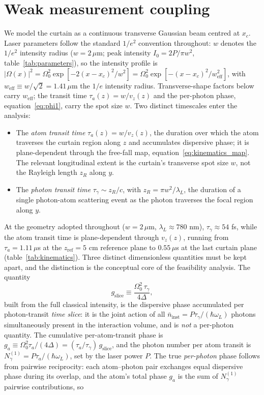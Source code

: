 \documentclass[11pt,a4paper]{article}
\begin{document}
\section{Weak measurement coupling}
\label{sec:coupling}

We model the curtain as a continuous transverse Gaussian beam centred at $x_c$. Laser parameters follow the standard $1/e^2$ convention throughout: $w$ denotes the $1/e^2$ intensity radius ($w = 2\,\mu$m; peak intensity $I_0 = 2P/\pi w^2$, table~\ref{tab:parameters}), so the intensity profile is $|\Omega(x)|^2 = \Omega_0^2 \exp[-2(x-x_c)^2/w^2] = \Omega_0^2 \exp[-(x-x_c)^2/w_\text{eff}^2]$, with $w_\text{eff} \equiv w/\sqrt{2} = 1.41\,\mu$m the $1/e$ intensity radius. Transverse-shape factors below carry $w_\text{eff}$; the transit time $\tau_a(z) = w/v_z(z)$ and the per-photon phase, equation~\eqref{eq:phi1}, carry the spot size $w$. Two distinct timescales enter the analysis:
\begin{itemize}
\item The \emph{atom transit time} $\tau_a(z) = w/v_z(z)$, the duration over which the atom traverses the curtain region along $z$ and accumulates dispersive phase; it is plane-dependent through the free-fall map, equation~\eqref{eq:kinematics_map}. The relevant longitudinal extent is the curtain's transverse spot size $w$, not the Rayleigh length $z_R$ along $y$.
\item The \emph{photon transit time} $\tau_\gamma \sim z_R/c$, with $z_R = \pi w^2/\lambda_L$, the duration of a single photon-atom scattering event as the photon traverses the focal region along $y$.
\end{itemize}
At the geometry adopted throughout ($w = 2\,\mu$m, $\lambda_L \approx 780$ nm), $\tau_\gamma \approx 54$ fs, while the atom transit time is plane-dependent through $v_z(z)$, running from $\tau_a = 1.11\,\mu$s at the $z_\text{ref} = 5$ cm reference plane to $0.55\,\mu$s at the last curtain plane (table~\ref{tab:kinematics}). Three distinct dimensionless quantities must be kept apart, and the distinction is the conceptual core of the feasibility analysis. The quantity
\begin{equation}
g_\text{slice} \equiv \frac{\Omega_0^2\,\tau_\gamma}{4\Delta},
\label{eq:g_slice}
\end{equation}
built from the full classical intensity, is the dispersive phase accumulated per photon-transit \emph{time slice}: it is the joint action of all $\bar{n}_\text{inst} = P\tau_\gamma/(\hbar\omega_L)$ photons simultaneously present in the interaction volume, and is \emph{not} a per-photon quantity. The cumulative per-atom-transit phase is $g_a \equiv \Omega_0^2\tau_a/(4\Delta) = (\tau_a/\tau_\gamma)\,g_\text{slice}$, and the photon number per atom transit is $N_\gamma^{(1)} = P\tau_a/(\hbar\omega_L)$, set by the laser power $P$. The true \emph{per-photon} phase follows from pairwise reciprocity: each atom--photon pair exchanges equal dispersive phase during its overlap, and the atom's total phase $g_a$ is the sum of $N_\gamma^{(1)}$ pairwise contributions, so
\end{document}
